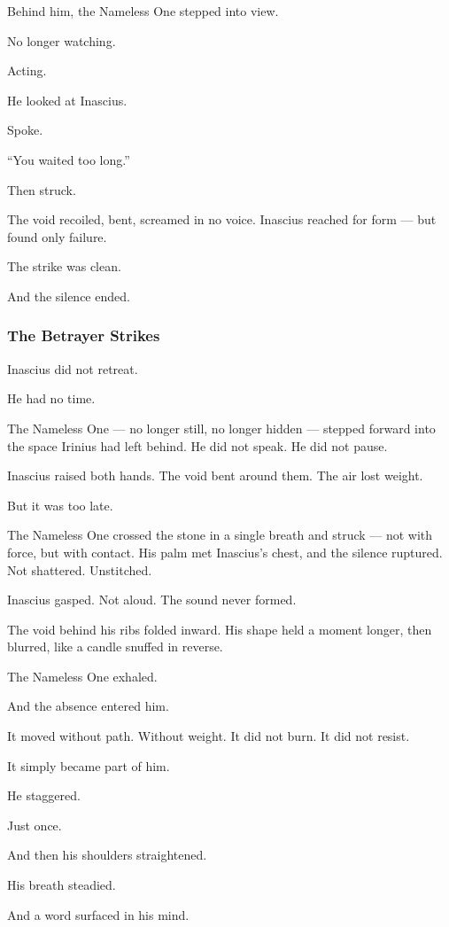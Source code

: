 \documentclass[12pt]{article}
\begin{document}
Behind him, the Nameless One stepped into view.

No longer watching.

Acting.

He looked at Inascius.

Spoke.

``You waited too long.''

Then struck.

The void recoiled, bent, screamed in no voice. Inascius reached for form — but found only failure.

The strike was clean.

And the silence ended.


\dotfill

\subsubsection*{The Betrayer Strikes}

Inascius did not retreat.

He had no time.

The Nameless One — no longer still, no longer hidden — stepped forward into the space Irinius had left behind. He did not speak. He did not pause.

Inascius raised both hands. The void bent around them. The air lost weight.

But it was too late.

The Nameless One crossed the stone in a single breath and struck — not with force, but with contact. His palm met Inascius’s chest, and the silence ruptured. Not shattered. Unstitched.

Inascius gasped. Not aloud. The sound never formed.

The void behind his ribs folded inward. His shape held a moment longer, then blurred, like a candle snuffed in reverse.

The Nameless One exhaled.

And the absence entered him.

It moved without path. Without weight. It did not burn. It did not resist.

It simply became part of him.

He staggered.

Just once.

And then his shoulders straightened.

His breath steadied.

And a word surfaced in his mind.
\end{document}
